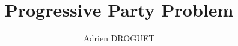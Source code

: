 \documentclass[a4paper,10pt]{report}
\title{Progressive Party Problem}
\author{Adrien DROGUET}
\begin{document}
\maketitle

\tableofcontents
\pagebreak

\begin{abstract}
\end{abstract}
\end{document}
